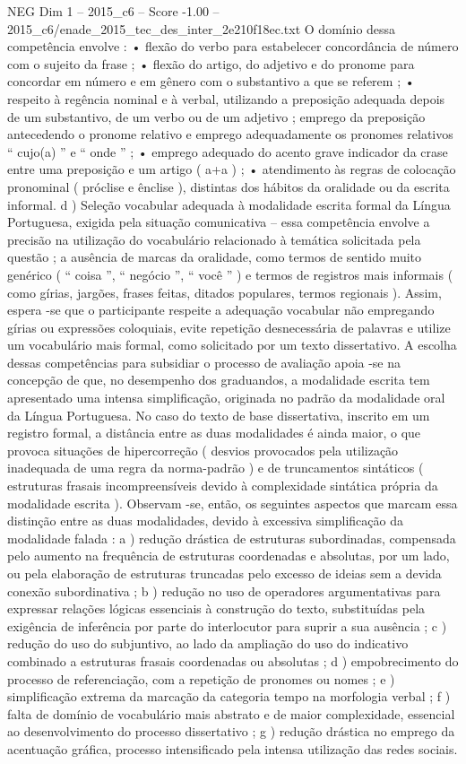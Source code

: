 \begin{textsample}{NEG Dim 1 – 2015\_c6 – Score -1.00 – 2015\_c6/enade\_2015\_tec\_des\_inter\_2e210f18ec.txt}
O domínio dessa competência envolve : • flexão do verbo para estabelecer concordância de número com o sujeito da frase ; • flexão do artigo, do adjetivo e do pronome para concordar em número e em gênero com o substantivo a que se referem ; • respeito à regência nominal e à verbal, utilizando a preposição adequada depois de um substantivo, de um verbo ou de um adjetivo ; emprego da preposição antecedendo o pronome relativo e emprego adequadamente os pronomes relativos “ cujo(a) ” e “ onde ” ; • emprego adequado do acento grave indicador da crase entre uma preposição e um artigo ( a+a ) ; • atendimento às regras de colocação pronominal ( próclise e ênclise ), distintas dos hábitos da oralidade ou da escrita informal. d ) Seleção vocabular adequada à modalidade escrita formal da Língua Portuguesa, exigida pela situação comunicativa – essa competência envolve a precisão na utilização do vocabulário relacionado à temática solicitada pela questão ; a ausência de marcas da oralidade, como termos de sentido muito genérico ( “ coisa ”, “ negócio ”, “ você ” ) e termos de registros mais informais ( como gírias, jargões, frases feitas, ditados populares, termos regionais ).
Assim, espera -se que o participante respeite a adequação vocabular não empregando gírias ou expressões coloquiais, evite repetição desnecessária de palavras e utilize um vocabulário mais formal, como solicitado por um texto dissertativo.
A escolha dessas competências para subsidiar o processo de avaliação apoia -se na concepção de que, no desempenho dos graduandos, a modalidade escrita tem apresentado uma intensa simplificação, originada no padrão da modalidade oral da Língua Portuguesa.
No caso do texto de base dissertativa, inscrito em um registro formal, a distância entre as duas modalidades é ainda maior, o que provoca situações de hipercorreção ( desvios provocados pela utilização inadequada de uma regra da norma-padrão ) e de truncamentos sintáticos ( estruturas frasais incompreensíveis devido à complexidade sintática própria da modalidade escrita ).
Observam -se, então, os seguintes aspectos que marcam essa distinção entre as duas modalidades, devido à excessiva simplificação da modalidade falada : a ) redução drástica de estruturas subordinadas, compensada pelo aumento na frequência de estruturas coordenadas e absolutas, por um lado, ou pela elaboração de estruturas truncadas pelo excesso de ideias sem a devida conexão subordinativa ; b ) redução no uso de operadores argumentativas para expressar relações lógicas essenciais à construção do texto, substituídas pela exigência de inferência por parte do interlocutor para suprir a sua ausência ; c ) redução do uso do subjuntivo, ao lado da ampliação do uso do indicativo combinado a estruturas frasais coordenadas ou absolutas ; d ) empobrecimento do processo de referenciação, com a repetição de pronomes ou nomes ; e ) simplificação extrema da marcação da categoria tempo na morfologia verbal ; f ) falta de domínio de vocabulário mais abstrato e de maior complexidade, essencial ao desenvolvimento do processo dissertativo ; g ) redução drástica no emprego da acentuação gráfica, processo intensificado pela intensa utilização das redes sociais.

\end{textsample}
